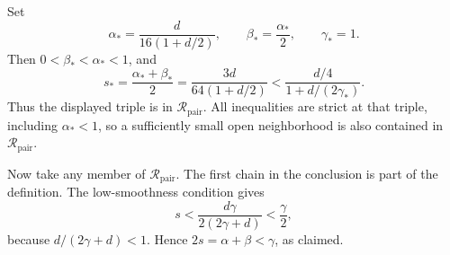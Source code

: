 Set
\[
\alpha_*=\frac{d}{16(1+d/2)},\qquad
\beta_*=\frac{\alpha_*}{2},\qquad
\gamma_*=1.
\]
Then \(0<\beta_*<\alpha_*<1\), and
\[
s_* =\frac{\alpha_*+\beta_*}{2}
=\frac{3d}{64(1+d/2)}
<\frac{d/4}{1+d/(2\gamma_*)}.
\]
Thus the displayed triple is in \(\mathcal R_{\mathrm{pair}}\).  All
inequalities are strict at that triple, including \(\alpha_*<1\), so a
sufficiently small open neighborhood is also contained in
\(\mathcal R_{\mathrm{pair}}\).

Now take any member of \(\mathcal R_{\mathrm{pair}}\).  The first chain in
the conclusion is part of the definition.  The low-smoothness condition gives
\[
s<\frac{d\gamma}{2(2\gamma+d)}<\frac\gamma2,
\]
because \(d/(2\gamma+d)<1\).  Hence \(2s=\alpha+\beta<\gamma\), as
claimed.